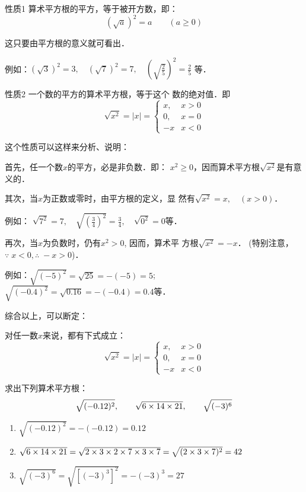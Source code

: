 \begin{blk}{性质1}
    算术平方根的平方，等于被开方数，即：
$$\left(\sqrt{a}\right)^2=a\qquad (a\ge 0)$$
\end{blk}

这只要由平方根的意义就可看出．

例如：$(\sqrt{3})^2=3,\quad (\sqrt{7})^2=7,\quad \left(\sqrt{\frac{2}{5}}\right)^2=\frac{2}{5}$
等．

\begin{blk}{性质2}
    一个数的平方的算术平方根，等于这个
数的绝对值．即
\[\sqrt{x^2}=|x|=\begin{cases}
    x,& x>0\\
    0, &x=0\\
    -x & x<0
\end{cases}\]
\end{blk}

这个性质可以这样来分析、说明：

首先，任一个数$x$的平方，必是非负数．即：
$x^2\ge 0$，因而算术平方根$\sqrt{x^2}$是有意义的．

其次，当$x$为正数或零时，由平方根的定义，显
然有$\sqrt{x^2}=x,\quad (x>0)$．

例如：
$\sqrt{7^2}=7,\quad\sqrt{\left(\frac{3}{4}\right)^2}=\frac{3}{4},\quad \sqrt{0^2}=0$等．


再次，当$x$为负数时，仍有$x^2>0$, 因而，算术平
方根$\sqrt{x^2}=-x$． (特别注意，$\because\; x<0, \therefore\; -x>0$)．

例如：$\sqrt{(-5)^2}=\sqrt{25}=-(-5)=5$; 
$\sqrt{(-0.4)^2}=\sqrt{0.16}=-(-0.4)=0.4$等．

综合以上，可以断定：

对任一数$x$来说，都有下式成立：
\[\sqrt{x^2}=|x|=\begin{cases}
    x,& x>0\\
    0, &x=0\\
    -x & x<0
\end{cases}\]


\begin{example}
    求出下列算术平方根：
\[ \sqrt{(-0.12)^2},\qquad \sqrt{6\times 14\times 21},\qquad \sqrt{(-3)^6} \]
\end{example}

\begin{solution}
\begin{enumerate}
    \item $ \sqrt{(-0.12)^2}=-(-0.12)=0.12$
    \item $\sqrt{6\times 14\times 21}=\sqrt{2\times3\times2\times7\times3\times7}=\sqrt{(2\times3\times7)^2}=42$
    \item $\sqrt{(-3)^6}=\sqrt{[(-3)^3]^2}=-(-3)^3=27$
\end{enumerate}
\end{solution}

